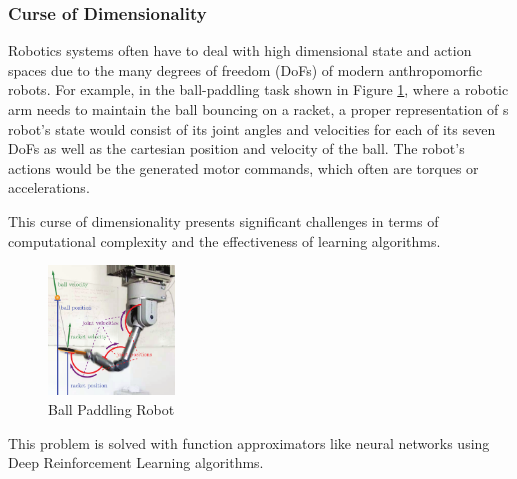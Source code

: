 \subsubsection{Curse of Dimensionality}
Robotics systems often have to deal with high dimensional state and action spaces due to the many degrees of freedom (DoFs) of modern
anthropomorfic robots. For example, in the ball-paddling task shown in Figure \ref{fig:ball_paddling_robot}, where a robotic arm needs to maintain the ball bouncing on a racket, a proper representation
of s robot's state would consist of its joint angles and velocities for each of its seven DoFs as well as the cartesian position
and velocity of the ball. The robot's actions would be the generated motor commands, which often are torques or accelerations.

This curse of dimensionality presents significant challenges in terms of computational complexity 
and the effectiveness of learning algorithms.

\begin{figure}[H]
    \centering
    \includegraphics[width=0.3\textwidth]{Images/ball_paddling.png}
    \caption{Ball Paddling Robot}
    \label{fig:ball_paddling_robot}
\end{figure}

This problem is solved with function approximators like neural networks using Deep Reinforcement Learning algorithms.


